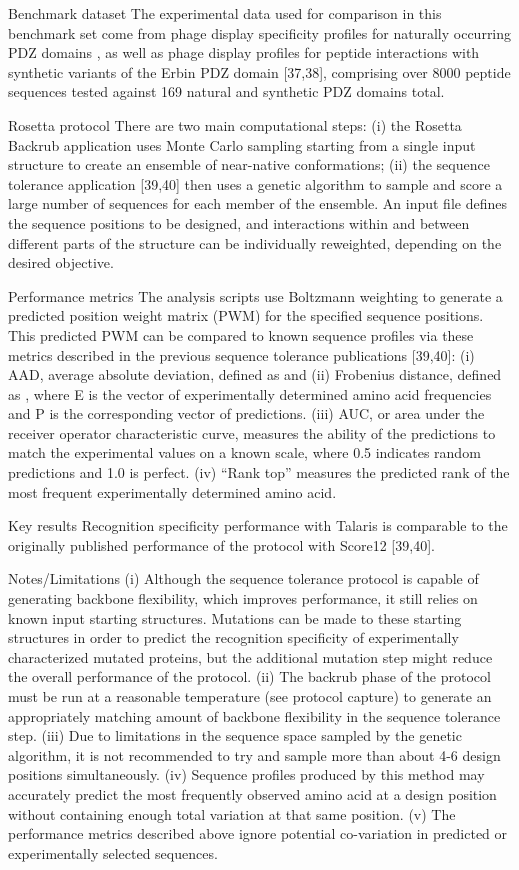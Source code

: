 Benchmark dataset
The experimental data used for comparison in this benchmark set come from phage display specificity profiles for naturally occurring PDZ domains \cite{tonikian_specificity_2008}, as well as phage display profiles for peptide interactions with synthetic variants of the Erbin PDZ domain [37,38], comprising over 8000 peptide sequences tested against 169 natural and synthetic PDZ domains total.

Rosetta protocol
There are two main computational steps: (i) the Rosetta Backrub application \cite{smith_backrub-like_2008} uses Monte Carlo sampling starting from a single input structure to create an ensemble of near-native conformations; (ii) the sequence tolerance application [39,40] then uses a genetic algorithm to sample and score a large number of sequences for each member of the ensemble. An input file defines the sequence positions to be designed, and interactions within and between different parts of the structure can be individually reweighted, depending on the desired objective.

Performance metrics
The analysis scripts use Boltzmann weighting to generate a predicted position weight matrix (PWM) for the specified sequence positions. This predicted PWM can be compared to known sequence profiles via these metrics described in the previous sequence tolerance publications [39,40]: (i) AAD, average absolute deviation, defined as  and (ii) Frobenius distance, defined as , where E is the vector of experimentally determined amino acid frequencies and P is the corresponding vector of predictions. (iii) AUC, or area under the receiver operator characteristic curve, measures the ability of the predictions to match the experimental values on a known scale, where 0.5 indicates random predictions and 1.0 is perfect. (iv) “Rank top” measures the predicted rank of the most frequent experimentally determined amino acid.

Key results
Recognition specificity performance with Talaris is comparable to the originally published performance of the protocol with Score12 [39,40].

Notes/Limitations
(i) Although the sequence tolerance protocol is capable of generating backbone flexibility, which improves performance, it still relies on known input starting structures. Mutations can be made to these starting structures in order to predict the recognition specificity of experimentally characterized mutated proteins, but the additional mutation step might reduce the overall performance of the protocol. (ii) The backrub phase of the protocol must be run at a reasonable temperature (see protocol capture) to generate an appropriately matching amount of backbone flexibility in the sequence tolerance step. (iii) Due to limitations in the sequence space sampled by the genetic algorithm, it is not recommended to try and sample more than about 4-6 design positions simultaneously. (iv) Sequence profiles produced by this method may accurately predict the most frequently observed amino acid at a design position without containing enough total variation at that same position. (v) The performance metrics described above ignore potential co-variation in predicted or experimentally selected sequences.

